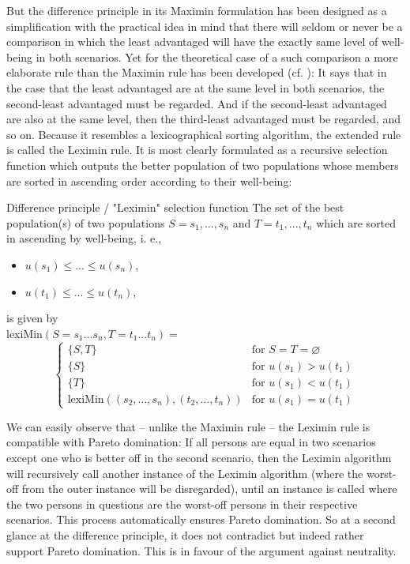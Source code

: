 But the difference principle in its Maximin formulation has been designed as a simplification with the practical idea in mind that there will seldom or never be a comparison in which the least advantaged will have the exactly same level of well-being in both scenarios. Yet for the theoretical case of a such comparison a more elaborate rule than the Maximin rule has been developed (cf. ): It says that in the case that the least advantaged are at the same level in both scenarios, the second-least advantaged must be regarded. And if the second-least advantaged are also at the same level, then the third-least advantaged must be regarded, and so on. Because it resembles a lexicographical sorting algorithm, the extended rule is called the Leximin rule. It is most clearly formulated as a recursive selection function which outputs the better population of two populations whose members are sorted in ascending order according to their well-being:  

\begin{Definition}{Difference principle / "Leximin" selection function}{}
The set of the best population(s) of two populations $S = s_1, ..., s_n$ and $T = t_1, ..., t_n$ which are sorted in ascending by well-being, i. e.,
\begin{itemize}
\item $u(s_1) \leq ... \leq u(s_n)$,
\item $u(t_1) \leq ... \leq u(t_n)$,
\end{itemize}
is given by \\
lexiMin$(S=s_1...s_n, T=t_1...t_n) = $ \\
\[
  \begin{cases}
    \{S, T\} & \text{for } S = T = \varnothing \\
    \{S\} & \text{for } u(s_1) > u(t_1) \\
    \{T\} & \text{for } u(s_1) < u(t_1) \\
    \text{lexiMin}\left((s_2, ..., s_n), (t_2, ..., t_n)\right) & \text{for } u(s_1) = u(t_1)
  \end{cases}
\]
\end{Definition}

We can easily observe that – unlike the Maximin rule – the Leximin rule is compatible with Pareto domination: If all persons are equal in two scenarios except one who is better off in the second scenario, then the Leximin algorithm will recursively call another instance of the Leximin algorithm (where the worst-off from the outer instance will be disregarded), until an instance is called where the two persons in questions are the worst-off persons in their respective scenarios. This process automatically ensures Pareto domination. So at a second glance at the difference principle, it does not contradict but indeed rather support Pareto domination. This is in favour of the argument against neutrality.  

